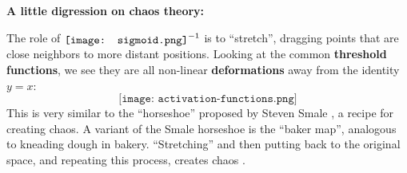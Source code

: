 \documentclass[orivec]{llncs}
\newcommand{\vect}[1]{\boldsymbol{#1}}
\newcommand*\sigmoid{\raisebox{-.2\height}{\texttt{[image: sigmoid.png]}}}
\begin{document}
\begin{tcolorbox}

\textbf{A little digression on chaos theory:}

The role of $\sigmoid^{-1}$ is to ``stretch'', dragging points that are close neighbors to more distant positions.  Looking at the common \textbf{threshold functions}, we see they are all non-linear \textbf{deformations} away from the identity $y = x$:
\begin{equation}
\texttt{[image: activation-functions.png]}
\end{equation}
This is very similar to the ``horseshoe'' proposed by Steven Smale \cite{Smale1967}, a recipe for creating chaos.  A variant of the Smale horseshoe is the ``baker map'', analogous to kneading dough in bakery.  ``Stretching'' and then putting back to the original space, and repeating this process, creates chaos \cite{Gilmore2011} \cite{Tel2006}.  





\end{tcolorbox}
\end{document}
